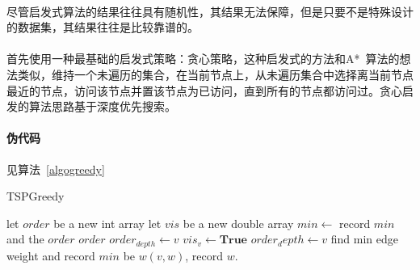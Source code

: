 \documentclass[UTF8,a4paper]{ctexart}
\begin{document}
\paragraph{}尽管启发式算法的结果往往具有随机性，其结果无法保障，但是只要不是特殊设计的数据集，其结果往往是比较靠谱的。
\paragraph{}首先使用一种最基础的启发式策略：贪心策略，这种启发式的方法和A*~\cite{astarredbloggames}算法的想法类似，维持一个未遍历的集合，在当前节点上，从未遍历集合中选择离当前节点最近的节点，访问该节点并置该节点为已访问，直到所有的节点都访问过。贪心启发的算法思路基于深度优先搜索。
\paragraph{伪代码}见算法~\ref{algogreedy}
\begin{algorithm}
    \caption{TSPGreedy}\label{algogreedy}
    \begin{algorithmic}[1] %
        \State let $order$ be a new int array
        \State let $vis$ be a new double array
        \State $min\gets$
        \State record $min$ and the $order$
        \EndFor
        \State \Return $order$
        \EndFunction
        \State
        \State $order_{depth}\gets v$
        \State {}
        \EndIf
        \State $vis_v\gets \textbf{True}$
        \State $order_depth\gets v$
        \State find min edge weight and record $min$ be $w(v,w)$, record $w$.
        \EndFor
        \State {}
        \EndFunction
    \end{algorithmic}
\end{algorithm}
\end{document}
